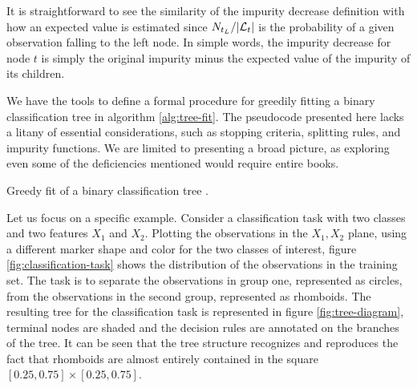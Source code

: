It is straightforward to see the similarity of the impurity decrease definition
with how an expected value is estimated since $N_{t_L} / |\mathcal{L}_t|$ is the
probability of a given observation falling to the left node. In simple words,
the impurity decrease for node $t$ is simply the original impurity minus the
expected value of the impurity of its children.

We have the tools to define a formal procedure for greedily fitting a binary
classification tree in algorithm \ref{alg:tree-fit}. The pseudocode presented
here lacks a litany of essential considerations, such as stopping criteria,
splitting rules, and impurity functions. We are limited to presenting a broad
picture, as exploring even some of the deficiencies mentioned would require
entire books.

\begin{algorithm}
    \caption[Greedy tree fitting algorithm]{Greedy fit of a binary
        classification tree \cite[Ch.~3.3]{louppe2014}.}
    \label{alg:tree-fit}
\end{algorithm}

Let us focus on a specific example. Consider a classification task with two
classes and two features $X_1$ and $X_2$. Plotting the observations in the $X_1,
X_2$ plane, using a different marker shape and color for the two classes of
interest, figure \ref{fig:classification-task} shows the distribution of the
observations in the training set. The task is to separate the observations in
group one, represented as circles, from the observations in the second group,
represented as rhomboids. The resulting tree for the classification task is
represented in figure \ref{fig:tree-diagram}, terminal nodes are shaded and the
decision rules are annotated on the branches of the tree. It can be seen that
the tree structure recognizes and reproduces the fact that rhomboids are almost
entirely contained in the square $[0.25, 0.75] \times [0.25, 0.75]$.

